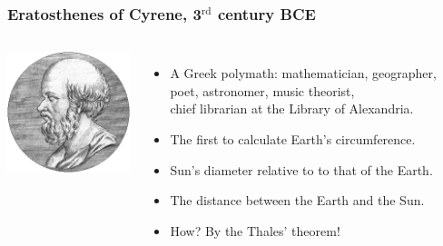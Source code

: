 \documentclass[aspectratio=169,xcolor=pdftex,dvipsnames]{beamer} %
\begin{document}
\begin{frame}
\frametitle{Eratosthenes of Cyrene, 3$^{\text{rd}}$ century BCE}

\begin{columns}
        
      \includegraphics[width=55mm]{eratosthenes.png}
\begin{itemize}
\item
A Greek polymath: mathematician, geographer, poet, astronomer, music theorist,\\
chief librarian at the Library of Alexandria.
\item
The first to calculate Earth's circumference.
\item
Sun's diameter relative to to that of the Earth.
\item
The distance between the Earth and the Sun.
\item
How? By the Thales' theorem!
\end{itemize}

\end{columns} 

\end{frame}
\end{document}
